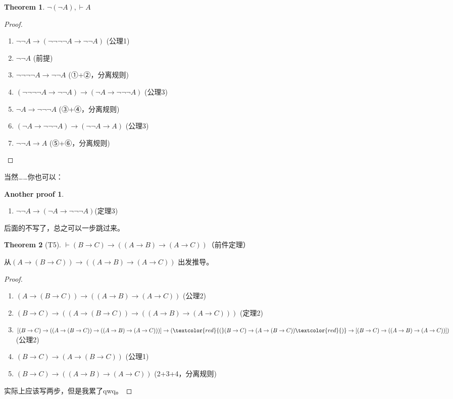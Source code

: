 \documentclass[oneside]{book}
\theoremstyle{definition}
\newtheorem{theorem}{Theorem}[section]
\newtheorem*{ap}{Another proof}
\begin{document}
\begin{theorem}
	$ \neg(\neg A) ,\vdash A$
\end{theorem}

\begin{proof}
\begin{enumerate}
	\item $\neg\neg A \to (\neg\neg\neg\neg A \to \neg\neg A)$ \hfill (公理1)
	\item $\neg\neg A$ \hfill (前提)
	\item $\neg\neg\neg\neg A \to \neg\neg A$ \hfill (①+②，分离规则)
	\item $(\neg\neg\neg\neg A \to \neg\neg A) \to (\neg A \to \neg\neg\neg A)$ \hfill (公理3)
	\item $\neg A \to \neg\neg\neg A$ \hfill (③+④，分离规则)
	\item $(\neg A \to \neg\neg\neg A) \to (\neg\neg A \to A)$ \hfill (公理3)
	\item $\neg\neg A \to A$ \hfill (⑤+⑥，分离规则)
\end{enumerate}
\end{proof}

当然……你也可以：
\begin{ap}
	\begin{enumerate}
		\item \(\neg\neg A\to (\neg A\to \neg\neg\neg A)\)\hfill(定理3)
	\end{enumerate}
	后面的不写了，总之可以一步跳过来。
\end{ap}
\begin{theorem}[T5]
	$\vdash (B \to C) \to ((A \to B) \to (A \to C))$（前件定理）
\end{theorem}
从$(A \to (B \to C)) \to ((A \to B) \to (A \to C))$ 出发推导。
\begin{proof}
\begin{enumerate}
	\item$(A \to (B \to C)) \to ((A \to B) \to (A \to C))$ \hfill (公理2)
	\item$(B \to C) \to \left((A \to (B \to C)) \to ((A \to B) \to (A \to C))\right)$ \hfill (定理2)
	\item$\left[(B \to C) \to \left((A \to (B \to C)) \to ((A \to B) \to (A \to C))\right)\right] \to (\textcolor{red}{(}(B \to C) \to (A \to (B \to C))\textcolor{red}{)}\to \left[(B \to C) \to ((A \to B) \to (A \to C))\right])$ \hfill (公理2)
	\item$(B \to C) \to (A \to (B \to C))$ \hfill (公理1)
	\item$(B \to C) \to ((A \to B) \to (A \to C))$ \hfill (2+3+4，分离规则)
\end{enumerate}
实际上应该写两步，但是我累了qwq。
\end{proof}
\end{document}
